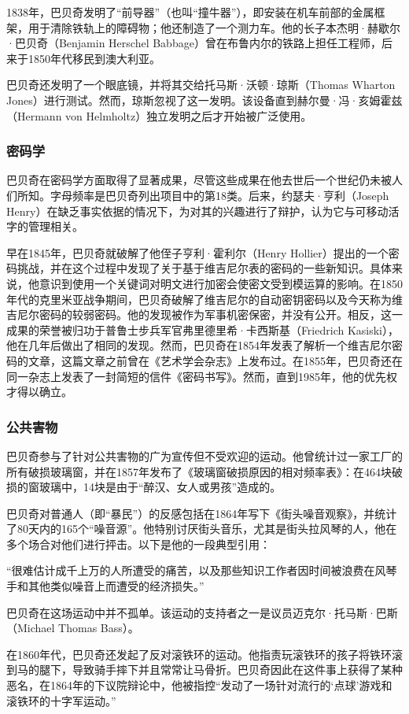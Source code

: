 1838年，巴贝奇发明了“前导器”（也叫“撞牛器”），即安装在机车前部的金属框架，用于清除铁轨上的障碍物；他还制造了一个测力车。他的长子本杰明·赫歇尔·巴贝奇（Benjamin Herschel Babbage）曾在布鲁内尔的铁路上担任工程师，后来于1850年代移民到澳大利亚。

巴贝奇还发明了一个眼底镜，并将其交给托马斯·沃顿·琼斯（Thomas Wharton Jones）进行测试。然而，琼斯忽视了这一发明。该设备直到赫尔曼·冯·亥姆霍兹（Hermann von Helmholtz）独立发明之后才开始被广泛使用。
\subsubsection{密码学}
巴贝奇在密码学方面取得了显著成果，尽管这些成果在他去世后一个世纪仍未被人们所知。字母频率是巴贝奇列出项目中的第18类。后来，约瑟夫·亨利（Joseph Henry）在缺乏事实依据的情况下，为对其的兴趣进行了辩护，认为它与可移动活字的管理相关。

早在1845年，巴贝奇就破解了他侄子亨利·霍利尔（Henry Hollier）提出的一个密码挑战，并在这个过程中发现了关于基于维吉尼尔表的密码的一些新知识。具体来说，他意识到使用一个关键词对明文进行加密会使密文受到模运算的影响。在1850年代的克里米亚战争期间，巴贝奇破解了维吉尼尔的自动密钥密码以及今天称为维吉尼尔密码的较弱密码。他的发现被作为军事机密保密，并没有公开。相反，这一成果的荣誉被归功于普鲁士步兵军官弗里德里希·卡西斯基（Friedrich Kasiski），他在几年后做出了相同的发现。然而，巴贝奇在1854年发表了解析一个维吉尼尔密码的文章，这篇文章之前曾在《艺术学会杂志》上发布过。在1855年，巴贝奇还在同一杂志上发表了一封简短的信件《密码书写》。然而，直到1985年，他的优先权才得以确立。
\subsubsection{公共害物}
巴贝奇参与了针对公共害物的广为宣传但不受欢迎的运动。他曾统计过一家工厂的所有破损玻璃窗，并在1857年发布了《玻璃窗破损原因的相对频率表》：在464块破损的窗玻璃中，14块是由于“醉汉、女人或男孩”造成的。

巴贝奇对普通人（即“暴民”）的反感包括在1864年写下《街头噪音观察》，并统计了80天内的165个“噪音源”。他特别讨厌街头音乐，尤其是街头拉风琴的人，他在多个场合对他们进行抨击。以下是他的一段典型引用：

“很难估计成千上万的人所遭受的痛苦，以及那些知识工作者因时间被浪费在风琴手和其他类似噪音上而遭受的经济损失。”

巴贝奇在这场运动中并不孤单。该运动的支持者之一是议员迈克尔·托马斯·巴斯（Michael Thomas Bass）。

在1860年代，巴贝奇还发起了反对滚铁环的运动。他指责玩滚铁环的孩子将铁环滚到马的腿下，导致骑手摔下并且常常让马骨折。巴贝奇因此在这件事上获得了某种恶名，在1864年的下议院辩论中，他被指控“发动了一场针对流行的‘点球’游戏和滚铁环的十字军运动。”